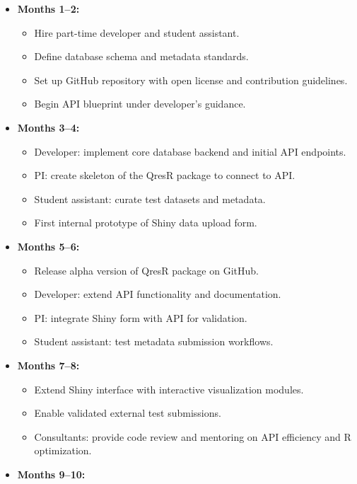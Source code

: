\documentclass[
  letterpaper,
  DIV=11,
  numbers=noendperiod]{scrartcl}
\providecommand{\tightlist}{%
  \setlength{\itemsep}{0pt}\setlength{\parskip}{0pt}}
\begin{document}
\begin{itemize}
\tightlist
\item
  \textbf{Months 1--2:}

  \begin{itemize}
  \tightlist
  \item
    Hire part-time developer and student assistant.
  \item
    Define database schema and metadata standards.
  \item
    Set up GitHub repository with open license and contribution
    guidelines.
  \item
    Begin API blueprint under developer's guidance.
  \end{itemize}
\item
  \textbf{Months 3--4:}

  \begin{itemize}
  \tightlist
  \item
    Developer: implement core database backend and initial API
    endpoints.
  \item
    PI: create skeleton of the QresR package to connect to API.
  \item
    Student assistant: curate test datasets and metadata.
  \item
    First internal prototype of Shiny data upload form.
  \end{itemize}
\item
  \textbf{Months 5--6:}

  \begin{itemize}
  \tightlist
  \item
    Release alpha version of QresR package on GitHub.
  \item
    Developer: extend API functionality and documentation.
  \item
    PI: integrate Shiny form with API for validation.
  \item
    Student assistant: test metadata submission workflows.
  \end{itemize}
\item
  \textbf{Months 7--8:}

  \begin{itemize}
  \tightlist
  \item
    Extend Shiny interface with interactive visualization modules.
  \item
    Enable validated external test submissions.
  \item
    Consultants: provide code review and mentoring on API efficiency and
    R optimization.
  \end{itemize}
\item
  \textbf{Months 9--10:}


\end{itemize}
\end{document}
